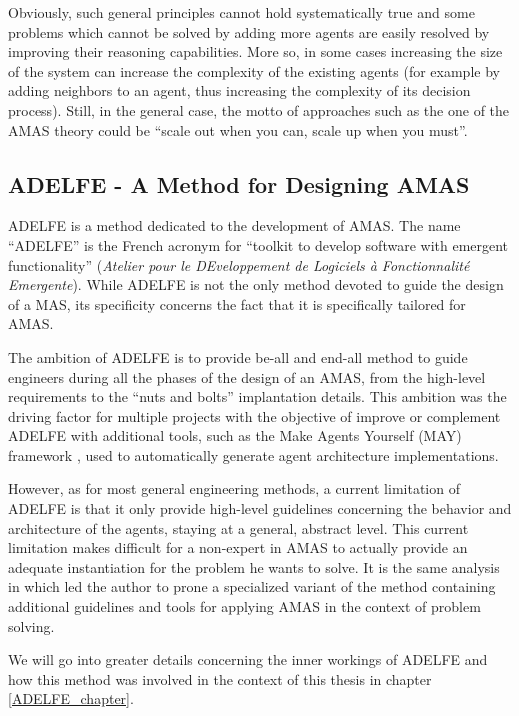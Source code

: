 Obviously, such general principles cannot hold systematically true and some problems which cannot be solved by adding more agents are easily resolved by improving their reasoning capabilities. More so, in some cases increasing the size of the system can increase the complexity of the existing agents (for example by adding neighbors to an agent, thus increasing the complexity of its decision process). Still, in the general case, the motto of approaches such as the one of the AMAS theory could be \enquote{scale out when you can, scale up when you must}. 

\subsection{ADELFE - A Method for Designing AMAS}\label{AMAS-ADELFE}

ADELFE \cite{bernon2003adelfe} is a method dedicated to the development of AMAS. The name \enquote{ADELFE} is the French acronym for \enquote{toolkit to develop software with emergent functionality} (\textit{Atelier pour le DEveloppement de Logiciels à Fonctionnalité Emergente}). While ADELFE is not the only method devoted to guide the design of a MAS, its specificity concerns the fact that it is specifically tailored for AMAS.

The ambition of ADELFE is to provide be-all and end-all method to guide engineers during all the phases of the design of an AMAS, from the high-level requirements to the \enquote{nuts and bolts} implantation details. This ambition was the driving factor for multiple projects with the objective of improve or complement ADELFE with additional tools, such as the Make Agents Yourself (MAY) framework \cite{No2012.2}, used to automatically generate agent architecture implementations.

However, as for most general engineering methods, a current limitation of ADELFE is that it only provide high-level guidelines concerning the behavior and architecture of the agents, staying at a general, abstract level. This current limitation makes difficult for a non-expert in AMAS to actually provide an adequate instantiation for the problem he wants to solve. It is the same analysis in \cite{Ka2011.6} which led the author to prone a specialized variant of the method containing additional guidelines and tools for applying AMAS in the context of problem solving.

We will go into greater details concerning the inner workings of ADELFE and how this method was involved in the context of this thesis in chapter \ref{ADELFE_chapter}.

